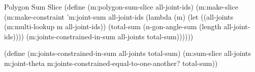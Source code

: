 \begin{code-listing}
[label=poly-sum-slice]
{Polygon Sum Slice}
(define (m:polygon-sum-slice all-joint-ids)
  (m:make-slice
   (m:make-constraint 'm:joint-sum all-joint-ids
    (lambda (m)
      (let ((all-joints (m:multi-lookup m all-joint-ids))
            (total-sum (n-gon-angle-sum (length all-joint-ids))))
        (m:joints-constrained-in-sum all-joints total-sum))))))

(define (m:joints-constrained-in-sum all-joints total-sum)
  (m:sum-slice all-joints m:joint-theta
   m:joints-constrained-equal-to-one-another? total-sum))
\end{code-listing}


\fi
